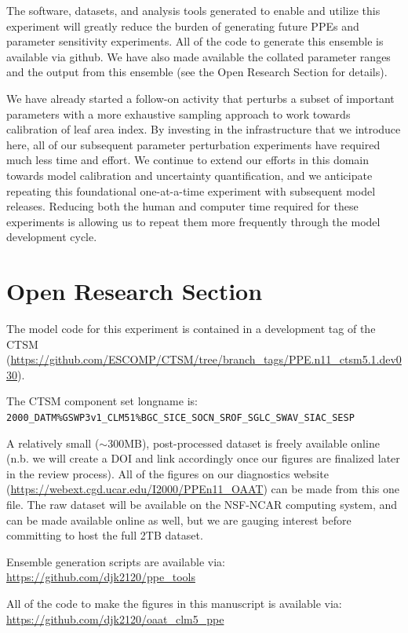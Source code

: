 \documentclass[draft]{agujournal2019}
\begin{document}
The software, datasets, and analysis tools generated to enable and utilize this experiment will greatly reduce the burden of generating future PPEs and parameter sensitivity experiments.
All of the code to generate this ensemble is available via github. We have also made available the collated parameter ranges and the output from this ensemble (see the Open Research Section for details).

We have already started a follow-on activity that perturbs a subset of important parameters with a more exhaustive sampling approach to work towards calibration of leaf area index. By investing in the infrastructure that we introduce here, all of our subsequent parameter perturbation experiments have required much less time and effort. We continue to extend our efforts in this domain towards model calibration and uncertainty quantification, and we anticipate repeating this foundational one-at-a-time experiment with subsequent model releases. Reducing both the human and computer time required for these experiments is allowing us to repeat them more frequently through the model development cycle.

\section*{Open Research Section}

The model code for this experiment is contained in a development tag of the CTSM (\url{https://github.com/ESCOMP/CTSM/tree/branch_tags/PPE.n11_ctsm5.1.dev030}).

The CTSM component set longname is: \\ \texttt{2000\_DATM\%GSWP3v1\_CLM51\%BGC\_SICE\_SOCN\_SROF\_SGLC\_SWAV\_SIAC\_SESP}

A relatively small ($\sim$300MB), post-processed dataset is freely available online (n.b. we will create a DOI and link accordingly once our figures are finalized later in the review process). All of the figures on our diagnostics website (\url{https://webext.cgd.ucar.edu/I2000/PPEn11_OAAT}) can be made from this one file. The raw dataset will be available on the NSF-NCAR computing system, and can be made available online as well, but we are gauging interest before committing to host the full 2TB dataset.

Ensemble generation scripts are available via: \\
\url{https://github.com/djk2120/ppe_tools}

All of the code to make the figures in this manuscript is available via: \\
\url{https://github.com/djk2120/oaat_clm5_ppe}
\end{document}
